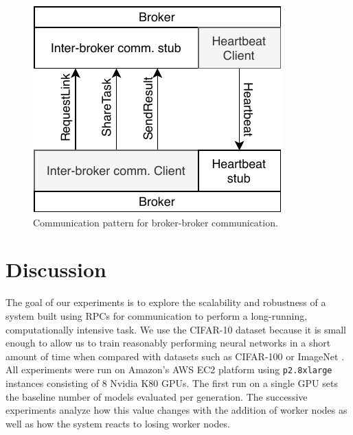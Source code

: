 \documentclass[conference]{IEEEtran}
\begin{document}
% 
% 
\begin{figure}
  \centering
  \includegraphics{img/broker_broker}
  \caption{Communication pattern for broker-broker communication.}
  \label{fig:broker-broker}
\end{figure}

\section{Discussion}
The goal of our experiments is to explore the scalability and robustness
of a system built using RPCs for communication to perform a long-running,
computationally intensive task. We use the CIFAR-10 \cite{cifar10-data}
dataset because it is small enough to allow us to train reasonably
performing neural networks in a short amount of time when compared with
datasets such as CIFAR-100 \cite{cifar100-data} or ImageNet \cite{imagenet_cvpr09}.
All experiments were run on Amazon's
AWS EC2 platform using \texttt{p2.8xlarge} instances consisting of 8
Nvidia K80 GPUs. The first run on a single GPU sets the baseline
number of models evaluated per generation. The successive experiments
analyze how this value changes with the addition of worker nodes as well
as how the system reacts to losing worker nodes.
\end{document}
